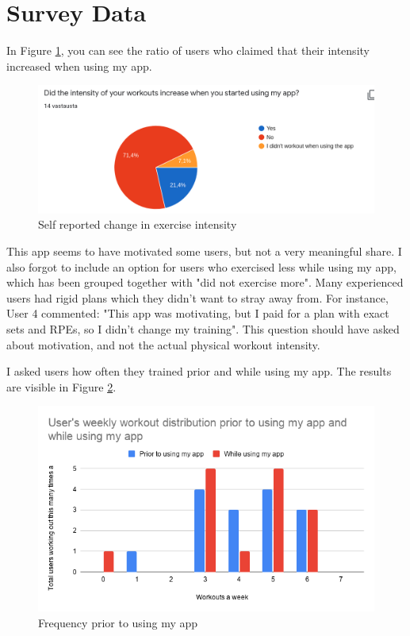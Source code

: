 \documentclass{l4proj}
\begin{document}
\section{Survey Data}
In Figure \ref{fig:intensity}, you can see the ratio of users who claimed that their intensity increased when using my app.
\begin{figure}[H]
    \centering
    \includegraphics[width=1.0\linewidth]{exercise_intensity.png}    
    \caption{Self reported change in exercise intensity}
    \label{fig:intensity} 
\end{figure}

This app seems to have motivated some users, but not a very meaningful share. I also forgot to include an option for users who exercised less while using my app, which has been grouped together with "did not exercise more". Many experienced users had rigid plans which they didn't want to stray away from. For instance, User 4 commented: "This app was motivating, but I paid for a plan with exact sets and RPEs, so I didn't change my training". This question should have asked about motivation, and not the actual physical workout intensity.

I asked users how often they trained prior and while using my app. The results are visible in Figure \ref{fig:workout_frequencies}. 
\begin{figure}[H]
    \centering
    \includegraphics[width=1.0\linewidth]{user_workout_distribution.png}    
    \caption{Frequency prior to using my app}
    \label{fig:workout_frequencies} 
\end{figure}
\end{document}
